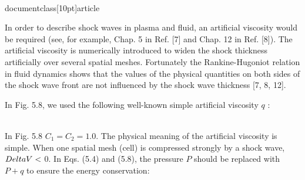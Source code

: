 \\documentclass[10pt]{article}
\begin{document}
{In order to describe shock waves in plasma and fluid, an artificial viscosity would be required (see, for example, Chap. 5 in Ref. [7] and Chap. 12 in Ref. [8]). The artificial viscosity is numerically introduced to widen the shock thickness artificially over several spatial meshes. Fortunately the Rankine-Hugoniot relation in fluid dynamics shows that the values of the physical quantities on both sides of the shock wave front are not influenced by the shock wave thickness [7, 8, 12].

In Fig. 5.8, we used the following well-known simple artificial viscosity $q$ :

\\[
q=\\rho \\begin{cases}0 & \\text { for } \\Delta V \\geq 0  \\tag{5.32}\\\\ C_{1}(\\Delta V)^{2}+C_{2}|\\Delta V| C_{s} & \\text { for } \\Delta V<0\\end{cases}
\\]

In Fig. 5.8 $C_{1}=C_{2}=1.0$. The physical meaning of the artificial viscosity is simple. When one spatial mesh (cell) is compressed strongly by a shock wave, $\\Delta V<$ 0. In Eqs. (5.4) and (5.8), the pressure $P$ should be replaced with $P+q$ to ensure the energy conservation:


}
\end{document}

